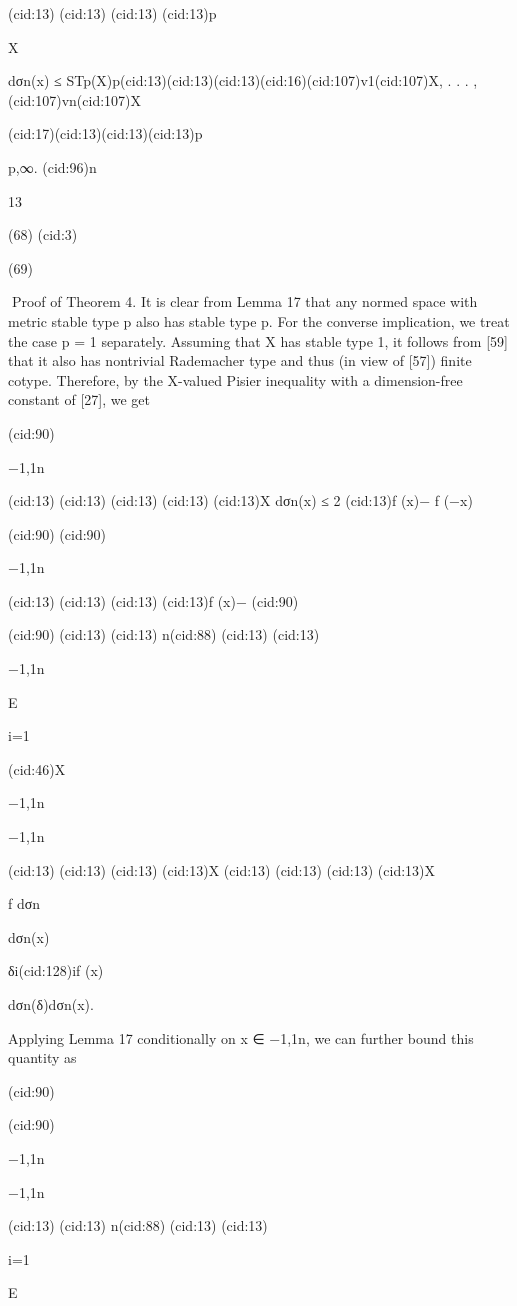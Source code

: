 {(cid:13)
(cid:13)
(cid:13)
(cid:13)p

X

dσn(x) ≤ STp(X)p(cid:13)(cid:13)(cid:13)(cid:16)(cid:107)v1(cid:107)X, . . . ,(cid:107)vn(cid:107)X

(cid:17)(cid:13)(cid:13)(cid:13)p

p,∞.
(cid:96)n

13

(68)
(cid:3)

(69)

Proof of Theorem 4. It is clear from Lemma 17 that any normed space with metric stable type
p also has stable type p. For the converse implication, we treat the case p = 1 separately.
Assuming that X has stable type 1, it follows from [59] that it also has nontrivial Rademacher
type and thus (in view of [57]) ﬁnite cotype. Therefore, by the X-valued Pisier inequality with
a dimension-free constant of [27], we get

(cid:90)

{−1,1}n

(cid:13)
(cid:13)
(cid:13)
(cid:13)
(cid:13)X dσn(x) ≤ 2
(cid:13)f (x)− f (−x)

(cid:90)
(cid:90)

{−1,1}n

(cid:13)
(cid:13)
(cid:13)
(cid:13)f (x)−
(cid:90)

(cid:90)
(cid:13)
(cid:13) n(cid:88)
(cid:13)
(cid:13)

{−1,1}n

E

i=1

(cid:46)X

{−1,1}n

{−1,1}n

(cid:13)
(cid:13)
(cid:13)
(cid:13)X
(cid:13)
(cid:13)
(cid:13)
(cid:13)X

f dσn

dσn(x)

δi(cid:128)if (x)

dσn(δ)dσn(x).

Applying Lemma 17 conditionally on x ∈ {−1,1}n, we can further bound this quantity as

(cid:90)

(cid:90)

{−1,1}n

{−1,1}n

(cid:13)
(cid:13) n(cid:88)
(cid:13)
(cid:13)

i=1

E

}
